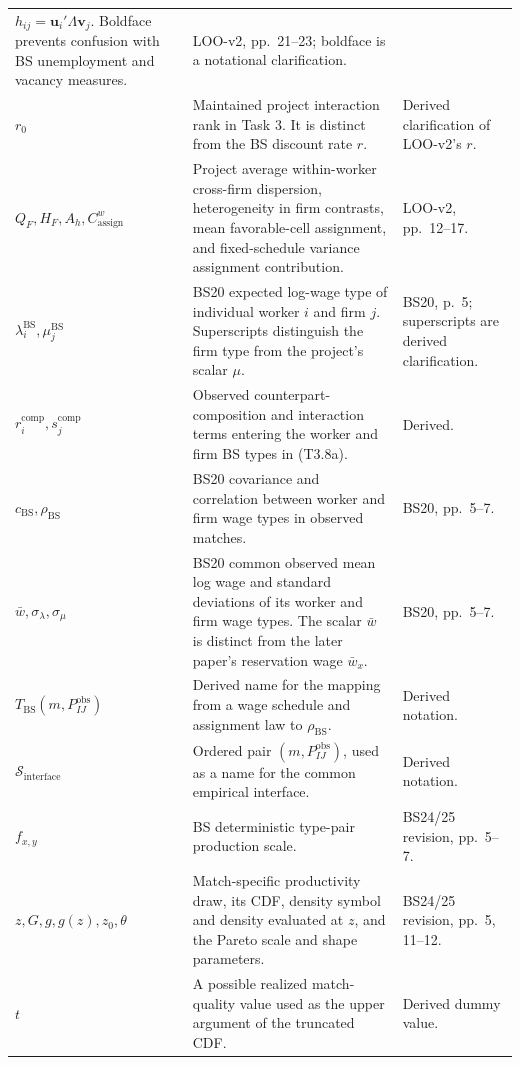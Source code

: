 \documentclass[11pt]{article}
\begin{document}
\begin{longtable}{p{}p{}p{}}
\(h_{ij}=\mathbf u_i'\Lambda\mathbf v_j\).  Boldface prevents confusion with
BS unemployment and vacancy measures. & LOO-v2, pp.\ 21--23; boldface is a
notational clarification. \\
\(r_0\) & Maintained project interaction rank in Task 3.  It is distinct from
the BS discount rate \(r\). & Derived clarification of LOO-v2's \(r\). \\
\(Q_F,H_F,A_h,C^w_{\mathrm{assign}}\) & Project average within-worker
cross-firm dispersion, heterogeneity in firm contrasts, mean favorable-cell
assignment, and fixed-schedule variance assignment contribution. & LOO-v2,
pp.\ 12--17. \\
\(\lambda_i^{\mathrm{BS}},\mu_j^{\mathrm{BS}}\) & BS20 expected log-wage type
of individual worker \(i\) and firm \(j\).  Superscripts distinguish the firm
type from the project's scalar \(\mu\). & BS20, p.\ 5; superscripts are
derived clarification. \\
\(r_i^{\mathrm{comp}},s_j^{\mathrm{comp}}\) & Observed counterpart-
composition and interaction terms entering the worker and firm BS types in
(T3.8a). & Derived. \\
\(c_{\mathrm{BS}},\rho_{\mathrm{BS}}\) & BS20 covariance and correlation
between worker and firm wage types in observed matches. & BS20, pp.\ 5--7. \\
\(\bar w,\sigma_\lambda,\sigma_\mu\) & BS20 common observed mean log wage and
standard deviations of its worker and firm wage types.  The scalar
\(\bar w\) is distinct from the later paper's reservation wage
\(\bar w_x\). & BS20, pp.\ 5--7. \\
\(T_{\mathrm{BS}}(m,P^{\mathrm{obs}}_{IJ})\) & Derived name for the mapping
from a wage schedule and assignment law to \(\rho_{\mathrm{BS}}\). & Derived
notation. \\
\(\mathcal S_{\mathrm{interface}}\) & Ordered pair
\((m,P^{\mathrm{obs}}_{IJ})\), used as a name for the common empirical
interface. & Derived notation. \\
\(f_{x,y}\) & BS deterministic type-pair production scale. & BS24/25
revision, pp.\ 5--7. \\
\(z,G,g,g(z),z_0,\theta\) & Match-specific productivity draw, its CDF,
density symbol and density evaluated at \(z\),
and the Pareto scale and shape parameters. & BS24/25 revision, pp.\ 5,
11--12. \\
\(t\) & A possible realized match-quality value used as the upper argument
of the truncated CDF. & Derived dummy value. \\

\end{longtable}
\end{document}
